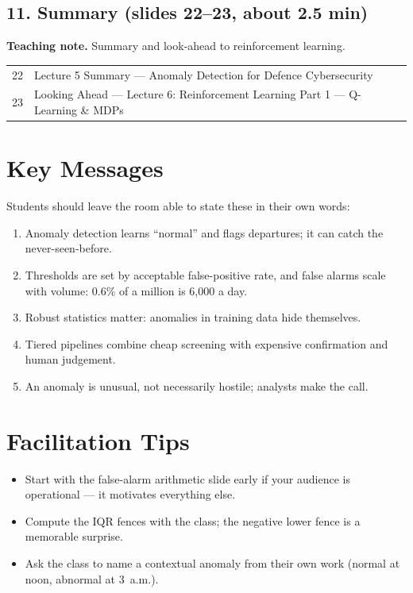 \documentclass[11pt]{article}
\begin{document}
\subsection{11. Summary \normalfont\small\color{GreyN}(slides 22--23, about 2.5 min)}

\textbf{Teaching note.} Summary and look-ahead to reinforcement learning.

\begin{center}\small\renewcommand{\arraystretch}{1.1}\begin{tabularx}{\textwidth}{@{}r X@{}}22 & Lecture 5 Summary --- Anomaly Detection for Defence Cybersecurity\\
23 & Looking Ahead --- Lecture 6: Reinforcement Learning Part 1 --- Q-Learning \& MDPs\\\end{tabularx}\end{center}

\section{Key Messages}Students should leave the room able to state these in their own words:\begin{keypoint}\begin{enumerate}\item Anomaly detection learns ``normal'' and flags departures; it can catch the never-seen-before.\item Thresholds are set by acceptable false-positive rate, and false alarms scale with volume: 0.6\% of a million is 6,000 a day.\item Robust statistics matter: anomalies in training data hide themselves.\item Tiered pipelines combine cheap screening with expensive confirmation and human judgement.\item An anomaly is unusual, not necessarily hostile; analysts make the call.\end{enumerate}\end{keypoint}

\section{Facilitation Tips}\begin{itemize}\item Start with the false-alarm arithmetic slide early if your audience is operational --- it motivates everything else.\item Compute the IQR fences with the class; the negative lower fence is a memorable surprise.\item Ask the class to name a contextual anomaly from their own work (normal at noon, abnormal at 3~a.m.).\end{itemize}
\end{document}
